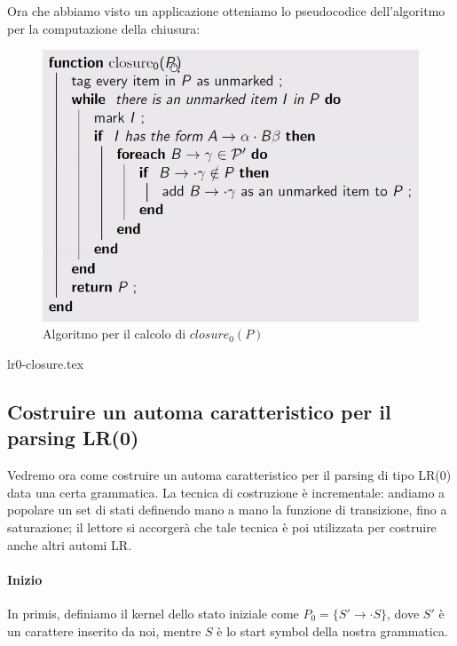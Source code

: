 \documentclass[class=book, crop=false, oneside, 12pt]{standalone}
\begin{document}
Ora che abbiamo visto un applicazione otteniamo lo pseudocodice dell'algoritmo per la computazione della chiusura:
\begin{figure}[H]
    \centering
    \includegraphics[width=.8\textwidth]{bottom-up-parsing_closure_algorithm.png}
    \caption{Algoritmo per il calcolo di \(closure_0(P)\)}
\end{figure}
{lr0-closure.tex}

\subsection{Costruire un automa caratteristico per il parsing LR(0)}
Vedremo ora come costruire un automa caratteristico per il parsing di tipo LR(0) data una certa grammatica. La tecnica di costruzione è incrementale: andiamo a popolare un set di stati definendo mano a mano la funzione di transizione, fino a saturazione; il lettore si accorgerà che tale tecnica è poi utilizzata per costruire anche altri automi LR.

\paragraph{Inizio}
In primis, definiamo il kernel dello stato iniziale come \(P_0 = \{S' \to \cdot S\}\), dove \(S'\) è un carattere inserito da noi, mentre \(S\) è lo start symbol della nostra grammatica.
\end{document}
